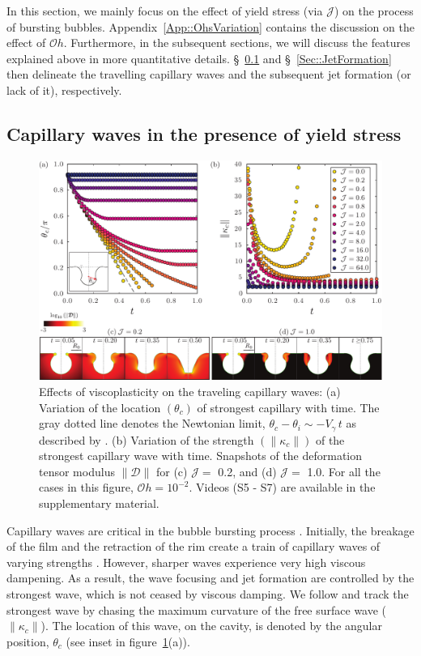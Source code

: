 \documentclass[final]{jfm}
\begin{document}
In this section, we mainly focus on the effect of yield stress (via $\mathcal{J}$) on the process of bursting bubbles. Appendix~\ref{App::OhsVariation} contains the discussion on the effect of $\mathcal{O}h$. Furthermore, in the subsequent sections, we will discuss the features explained above in more quantitative details. \S~\ref{Sec::CapillaryWaves} and \S~\ref{Sec::JetFormation} then delineate the travelling capillary waves and the subsequent jet formation (or lack of it), respectively.  

\subsection{Capillary waves in the presence of yield stress}\label{Sec::CapillaryWaves}
\begin{figure}
	\centerline{\includegraphics[width=\linewidth]{Figure3_EarlyTimes-eps-converted-to.pdf}}%
	\caption{Effects of viscoplasticity on the traveling capillary waves: (a) Variation of the location $\left(\theta_c\right)$ of strongest capillary with time. The gray dotted line denotes the Newtonian limit, $\theta_c -\theta_i \sim -V_\gamma\,t$ as described by \citet{gordillo2019capillary}. (b) Variation of the strength $\left(\|\kappa_c\|\right)$ of the strongest capillary wave with time. Snapshots of the deformation tensor modulus $\|\boldsymbol{\mathcal{D}}\|$ for (c) $\mathcal{J} =$ 0.2, and (d) $\mathcal{J} =$ 1.0. For all the cases in this figure, $\mathcal{O}h = 10^{-2}$. Videos (S5 - S7) are available in the supplementary material.}
	\label{fig:Jcar_EarlyTimes}
\end{figure}
Capillary waves are critical in the bubble bursting process \citep{gordillo2019capillary}. Initially, the breakage of the film and the retraction of the rim create a train of capillary waves of varying strengths \citep{gekle2009high}. However, sharper waves experience very high viscous dampening. As a result, the wave focusing and jet formation are controlled by the strongest wave, which is not ceased by viscous damping. We follow \citet{gordillo2019capillary} and track the strongest wave by chasing the maximum curvature of the free surface wave ($\|\kappa_c\|$). The location of this wave, on the cavity, is denoted by the angular position, $\theta_c$ (see inset in figure~\ref{fig:Jcar_EarlyTimes}(a)). 
\end{document}
